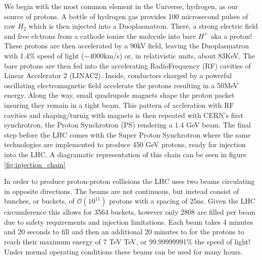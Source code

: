 We begin with the most common element in the Universe, hydrogen, as our source
of protons.  A bottle of hydrogen gas provides 100 microsecond pulses of raw
$H_{2}$ which is then injected into a Duoplasmatron. There,  a strong electric
field and free elctrons from a cathode ionize the molecule into bare $H^{+}$ aka
a proton!  These protons are then accelerated by a 90kV field, leaving the
Duoplasmatron with 1.4\% speed of light ($\sim$4000km/s) or, in relativistic
units, about 83KeV. The bare protons are then fed into the accelerating
RadioFrequency (RF) cavities of Linear Accelerator 2 (LINAC2). Inside,
conductors charged by a powerful oscillating electromagnetic field accelerate
the protons resulting in a 50MeV energy. Along the way, small quadrupole magnets
shape the proton packet insuring they remain in a tight beam.  This pattern of
accleration with RF cavities and shaping/turnig with magnets is then repeated
with CERN's first synchrotron, the Proton Synchrotron (PS) rendering a 1.4 GeV
beam.  The final step before the LHC comes with the Super Proton Synchrotron
where the same technologies are implemented to produce 450 GeV protons, ready
for injection into the LHC. A diagramatic representation of this chain can be
seen in figure \ref{fig:injection_chain} 

In order to produce proton-proton collisions the LHC uses two beams circulating
in opposite directions.  The beams are not continuous, but instead consist of
bunches, or buckets, of $\mathcal{O}(10^{11})$ protons with a spacing of 25ns.
Given the LHC circumference this allows for 3564 buckets, however only 2808 are
filled per beam due to safety requirements and injection limitations.  Each beam
takes 4 minutes and 20 seconds to fill and then an additional 20 minutes to for
the protons to reach their maximum energy of 7 TeV TeV, or 99.99999991\% the
speed of light! Under normal operating conditions these beams can be used for
many hours.
